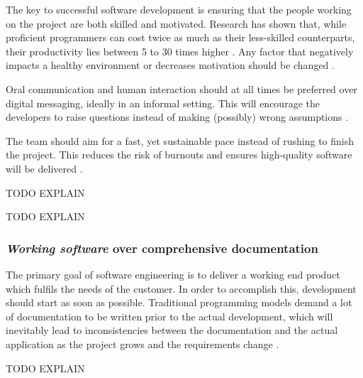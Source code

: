 The key to successful software development is ensuring that the people working on the project are both skilled and motivated. Research has shown that, while proficient programmers can cost twice as much as their less-skilled counterparts, their productivity lies between 5 to 30 times higher \cite{glass2001agile}. Any factor that negatively impacts a healthy environment or decreases motivation should be changed \cite[p.~34]{martin2014}.

Oral communication and human interaction should at all times be preferred over digital messaging, ideally in an informal setting. This will encourage the developers to raise questions instead of making (possibly) wrong assumptions \cite{glass2001agile}.

The team should aim for a fast, yet sustainable pace instead of rushing to finish the project. This reduces the risk of burnouts and ensures high-quality software will be delivered \cite{martin2014}.

TODO EXPLAIN

TODO EXPLAIN

\subsubsection{\emph{Working software} over comprehensive documentation}
The primary goal of software engineering is to deliver a working end product which fulfils the needs of the customer. In order to accomplish this, development should start as soon as possible. Traditional programming models demand a lot of documentation to be written prior to the actual development, which will inevitably lead to inconsistencies between the documentation and the actual application as the project grows and the requirements change \cite{Hazzan2014}. 
	
TODO EXPLAIN

